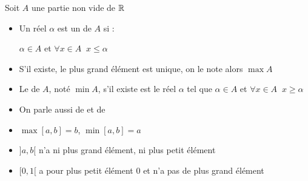 \begin{frame}
\begin{mydefinition}
\label{def:max}

Soit $A$ une partie non vide de $\mathbb{R}$

\begin{itemize}
  \item Un réel $\alpha$ est un  de $A$ si :
 \centerline{$\alpha \in A$ \qquad  et \qquad  $\forall x \in A \;\; x\leq \alpha$}

\pause

  \item S'il existe, le plus grand élément est unique, on le note alors $\max A$

\pause

  \item Le  de $A$, noté $\min A$, s'il existe est le réel
$\alpha$ tel que $\alpha \in A$ et $\forall x \in A \;\; x \ge \alpha$

\pause

  \item On parle aussi de  et de 
\end{itemize}
\end{mydefinition}


\pause

\begin{exemple}
\begin{itemize}
  \item $\max[a,b]=b$, $\min [a,b]=a$
\pause
  \item $]a,b[$ n'a ni plus grand élément, ni plus petit élément
\pause
  \item $[0,1[$ a pour plus petit élément $0$ et n'a pas de plus grand élément
\end{itemize}
\end{exemple}

\end{frame}


